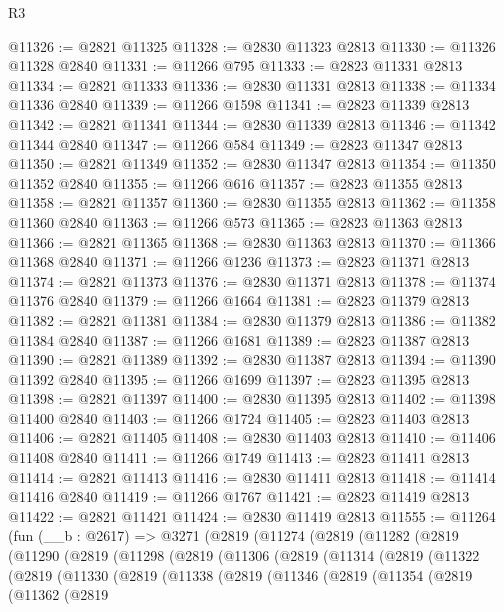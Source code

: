 \begin{lexlean}{R3}
\begin{coremodule}
@11326 := @2821 @11325
@11328 := @2830 @11323 @2813
@11330 := @11326 @11328 @2840
@11331 := @11266 @795
@11333 := @2823 @11331 @2813
@11334 := @2821 @11333
@11336 := @2830 @11331 @2813
@11338 := @11334 @11336 @2840
@11339 := @11266 @1598
@11341 := @2823 @11339 @2813
@11342 := @2821 @11341
@11344 := @2830 @11339 @2813
@11346 := @11342 @11344 @2840
@11347 := @11266 @584
@11349 := @2823 @11347 @2813
@11350 := @2821 @11349
@11352 := @2830 @11347 @2813
@11354 := @11350 @11352 @2840
@11355 := @11266 @616
@11357 := @2823 @11355 @2813
@11358 := @2821 @11357
@11360 := @2830 @11355 @2813
@11362 := @11358 @11360 @2840
@11363 := @11266 @573
@11365 := @2823 @11363 @2813
@11366 := @2821 @11365
@11368 := @2830 @11363 @2813
@11370 := @11366 @11368 @2840
@11371 := @11266 @1236
@11373 := @2823 @11371 @2813
@11374 := @2821 @11373
@11376 := @2830 @11371 @2813
@11378 := @11374 @11376 @2840
@11379 := @11266 @1664
@11381 := @2823 @11379 @2813
@11382 := @2821 @11381
@11384 := @2830 @11379 @2813
@11386 := @11382 @11384 @2840
@11387 := @11266 @1681
@11389 := @2823 @11387 @2813
@11390 := @2821 @11389
@11392 := @2830 @11387 @2813
@11394 := @11390 @11392 @2840
@11395 := @11266 @1699
@11397 := @2823 @11395 @2813
@11398 := @2821 @11397
@11400 := @2830 @11395 @2813
@11402 := @11398 @11400 @2840
@11403 := @11266 @1724
@11405 := @2823 @11403 @2813
@11406 := @2821 @11405
@11408 := @2830 @11403 @2813
@11410 := @11406 @11408 @2840
@11411 := @11266 @1749
@11413 := @2823 @11411 @2813
@11414 := @2821 @11413
@11416 := @2830 @11411 @2813
@11418 := @11414 @11416 @2840
@11419 := @11266 @1767
@11421 := @2823 @11419 @2813
@11422 := @2821 @11421
@11424 := @2830 @11419 @2813
@11555 := @11264
    (fun (__b : @2617) =>
    @3271
      (@2819
        (@11274
          (@2819
            (@11282
              (@2819
                (@11290
                  (@2819
                    (@11298
                      (@2819
                        (@11306
                          (@2819
                            (@11314
                              (@2819
                                (@11322
                                  (@2819
                                    (@11330
                                      (@2819
                                        (@11338
                                          (@2819
                                            (@11346
                                              (@2819
                                                (@11354
                                                  (@2819
                                                    (@11362
                                                      (@2819

\end{coremodule}
\end{lexlean}
